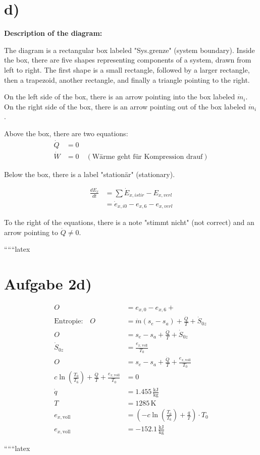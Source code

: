 \section*{d)}

\textbf{Description of the diagram:}

The diagram is a rectangular box labeled "Sys.grenze" (system boundary). Inside the box, there are five shapes representing components of a system, drawn from left to right. The first shape is a small rectangle, followed by a larger rectangle, then a trapezoid, another rectangle, and finally a triangle pointing to the right. 

On the left side of the box, there is an arrow pointing into the box labeled $\dot{m}_i$. On the right side of the box, there is an arrow pointing out of the box labeled $\dot{m}_i$.

Above the box, there are two equations:
\begin{align*}
    \dot{Q} &= 0 \\
    \dot{W} &= 0 \quad (\text{Wärme geht für Kompression drauf})
\end{align*}

Below the box, there is a label "stationär" (stationary).

\begin{align*}
    \frac{dE_x}{dt} &= \sum \dot{E}_{x,istir} - E_{x,verl} \\
    &= \dot{e}_{x,i0} - e_{x,6} - e_{x,verl}
\end{align*}

To the right of the equations, there is a note "stimmt nicht" (not correct) and an arrow pointing to $\dot{Q} \neq 0$.

``````latex

\section*{Aufgabe 2d)}

\begin{align*}
O &= e_{x,0} - e_{x,6} + \\
\text{Entropie:} \quad O &= \dot{m} (s_e - s_a) + \frac{\dot{Q}}{T} + \dot{S}_{0z} \\
O &= s_e - s_a + \frac{\dot{Q}}{T} + \dot{S}_{0z} \\
\dot{S}_{0z} &= \frac{e_{x,\text{voll}}}{T_0} \\
O &= s_e - s_a + \frac{\dot{Q}}{T} + \frac{e_{x,\text{voll}}}{T_0} \\
c \ln \left( \frac{T_0}{T_6} \right) + \frac{\dot{Q}}{T} + \frac{e_{x,\text{voll}}}{T_0} &= 0 \\
\dot{q} &= 1.455 \, \frac{\text{kJ}}{\text{kg}} \\
T &= 1285 \, \text{K} \\
e_{x,\text{voll}} &= \left( -c \ln \left( \frac{T_0}{T_6} \right) + \frac{q}{T} \right) \cdot T_0 \\
e_{x,\text{voll}} &= -152.1 \, \frac{\text{kJ}}{\text{kg}}
\end{align*}

``````latex


